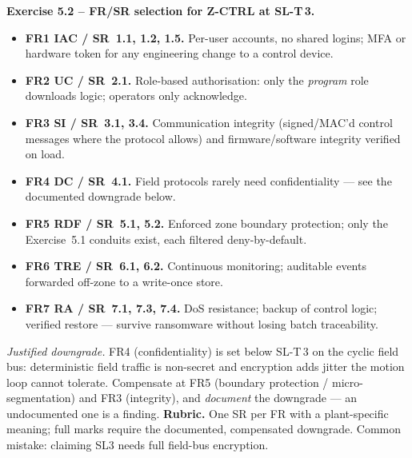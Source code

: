 \documentclass[11pt,a4paper]{article}
\begin{document}
\begin{solutionbox}
\textbf{Exercise 5.2 -- FR/SR selection for Z-CTRL at SL-T\,3.}
\begin{itemize}\setlength{\itemsep}{1pt}
  \item \textbf{FR1 IAC / SR~1.1, 1.2, 1.5.} Per-user accounts, no shared logins; MFA or hardware token for any engineering change to a control device.
  \item \textbf{FR2 UC / SR~2.1.} Role-based authorisation: only the \emph{program} role downloads logic; operators only acknowledge.
  \item \textbf{FR3 SI / SR~3.1, 3.4.} Communication integrity (signed/MAC'd control messages where the protocol allows) and firmware/software integrity verified on load.
  \item \textbf{FR4 DC / SR~4.1.} Field protocols rarely need confidentiality --- see the documented downgrade below.
  \item \textbf{FR5 RDF / SR~5.1, 5.2.} Enforced zone boundary protection; only the Exercise~5.1 conduits exist, each filtered deny-by-default.
  \item \textbf{FR6 TRE / SR~6.1, 6.2.} Continuous monitoring; auditable events forwarded off-zone to a write-once store.
  \item \textbf{FR7 RA / SR~7.1, 7.3, 7.4.} DoS resistance; backup of control logic; verified restore --- survive ransomware without losing batch traceability.
\end{itemize}
\emph{Justified downgrade.} FR4 (confidentiality) is set below SL-T\,3 on the cyclic field bus: deterministic field traffic is non-secret and encryption adds jitter the motion loop cannot tolerate. Compensate at FR5 (boundary protection / micro-segmentation) and FR3 (integrity), and \emph{document} the downgrade --- an undocumented one is a finding. \textbf{Rubric.} One SR per FR with a plant-specific meaning; full marks require the documented, compensated downgrade. Common mistake: claiming SL3 needs full field-bus encryption.
\end{solutionbox}
\end{document}

